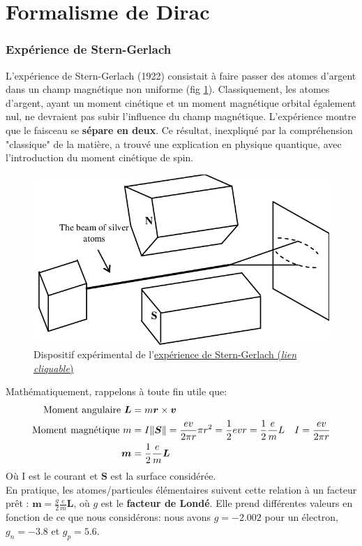 \documentclass[../notesdecours.tex]{subfiles}
\begin{document}
\part{Formalisme de Dirac} \label{Formalisme de Dirac}
\section{Expérience de Stern-Gerlach}
L'expérience de Stern-Gerlach (1922) consistait à faire passer des atomes d'argent dans un champ magnétique non uniforme (fig \ref{fig:chap4-sterngerlach}). Classiquement, les atomes d'argent, ayant un moment cinétique et un moment magnétique orbital également nul, ne devraient pas subir l'influence du champ magnétique. L'expérience montre que le faisceau se \textbf{sépare en deux}. Ce résultat, inexpliqué par la compréhension "classique" de la matière, a trouvé une explication en physique quantique, avec l'introduction du moment cinétique de spin.\\

\begin{figure}[h]
\centering
\includegraphics[width=0.5\linewidth]{Stern-Gerlach}
\caption{Dispositif expérimental de l'\href{https://fr.wikipedia.org/wiki/Expérience_de_Stern_et_Gerlach}{expérience de Stern-Gerlach (\textit{lien cliquable})}}
\label{fig:chap4-sterngerlach}
\end{figure}

Mathématiquement, rappelons à toute fin utile que:
\begin{align}
\text{Moment angulaire } \bm{L} &= m\bm{r}\times\bm{v} \label{Moment angulaire}\\
\text{Moment magnétique } m &= I\norm{\bm{S}}	= \frac{ev}{2\pi r} \pi r^2 = \frac{1}{2}evr = \frac{1}{2}\frac{e}{m}L	&I = \frac{ev}{2\pi r}\\
\bm{m} &= \frac{1}{2}\frac{e}{m}\bm{L} \label{moment magnétique}
\end{align}
Où I est le courant et $\bm{S}$ est la surface considérée.\\

En pratique, les atomes/particules élémentaires suivent cette relation à un facteur prêt : $\bm{m} = \frac{g}{2}\frac{e}{m}\bm{L}$, où $g$ est le \textbf{facteur de Londé}. Elle prend différentes valeurs en fonction de ce que nous considérons: nous avons $g = -2.002$ pour un électron, $g_n = -3.8$ et $g_p = 5.6$.\\
\end{document}

